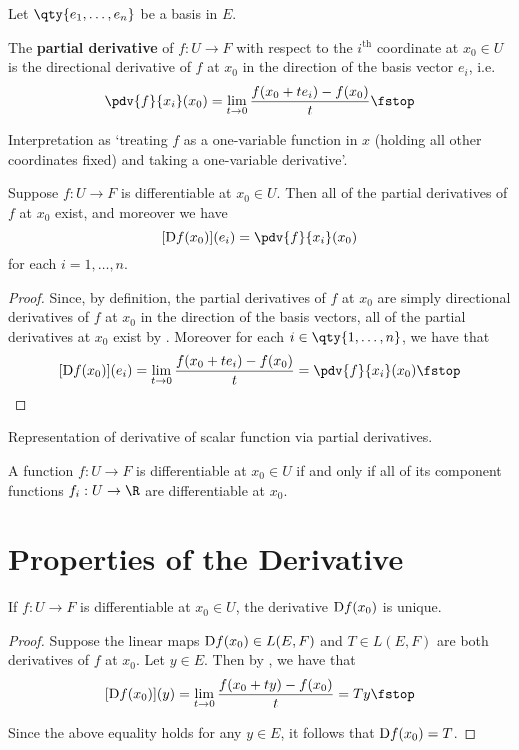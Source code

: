 Let \( \qty{e_1,\dots, e_n} \) be a basis in \( E \).

\begin{definition}
  The \textbf{partial derivative} of \( f:U\to F \) with respect to the \( i^{\text{th}} \) coordinate at \( x_0\in U \) is the directional derivative of \( f \) at \( x_0 \) in the direction of the basis vector \( e_i \), i.e.\
  \[ {\pdv{f}{x_i}} (x_0)=\lim_{t\to 0}\frac{f(x_0+te_i)-f(x_0)}{t}\fstop \]
\end{definition}

Interpretation as `treating \( f \) as a one-variable function in \( x \) (holding all other coordinates fixed) and taking a one-variable derivative'.

\begin{corollary}
  Suppose \( f:U\to F \) is differentiable at \( x_0\in U \). Then all of the partial derivatives of \( f \) at \( x_0 \) exist, and moreover we have
  \[ [\D f(x_0)](e_i)={\pdv{f}{x_i}}(x_0) \]
  for each \( i=1,\dots, n \).
\end{corollary}
\begin{proof}
  Since, by definition, the partial derivatives of \( f \) at \( x_0 \) are simply directional derivatives of \( f \) at \( x_0 \) in the direction of the basis vectors, all of the partial derivatives at \( x_0 \) exist by . Moreover for each \( i\in\qty{1,\dots,n} \), we have that
  \[ [\D f(x_0)](e_i)=\lim_{t\to 0}\frac{f(x_0+te_i)-f(x_0)}{t}={\pdv{f}{x_i}} (x_0)\fstop \]
\end{proof}

Representation of derivative of scalar function via partial derivatives.

\begin{proposition}
  A function \( f:U\to F \) is differentiable at \( x_0\in U \) if and only if all of its component functions \( f_i:U\to\R \) are differentiable at \( x_0 \).
\end{proposition}

\section{Properties of the Derivative}
\begin{proposition}
  If \( f:U\to F \) is differentiable at \( x_0\in U \), the derivative \( \text{D} f(x_0) \) is unique.
\end{proposition}
\begin{proof}
  Suppose the linear maps \( \text{D} f(x_0)\in L(E,F) \) and \( T\in L(E,F) \) are both derivatives of \( f \) at \( x_0 \). Let \( y\in E \). Then by , we have that
  \[ [\D f(x_0)](y)=\lim_{t\to 0}\frac{f(x_0+ty)-f(x_0)}{t}=Ty\fstop \]

  Since the above equality holds for any \( y\in E \), it follows that \( \text{D} f(x_0)=T \).
\end{proof}


